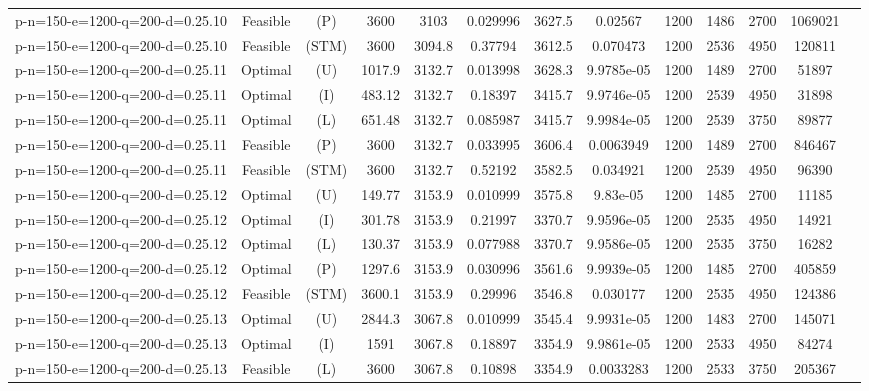\documentclass[landscape, a4paper]{article}
\newcommand{\STM}{\ensuremath{\mathrm{STM}}}
\newcommand{\Improved}{\ensuremath{\mathrm{I}}}
\newcommand{\Loose}{\ensuremath{\mathrm{L}}}
\newcommand{\Profit}{\ensuremath{\mathrm{P}}}
\newcommand{\Utility}{\ensuremath{\mathrm{U}}}
\begin{document}
\begin{center}
\begin{tabular}{lcccccccccccc}
p-n=150-e=1200-q=200-d=0.25.10 & Feasible & (\Profit) & 3600 & 3103 & 0.029996 & 3627.5 & 0.02567 & 1200 & 1486 & 2700 & 1069021 & \\
p-n=150-e=1200-q=200-d=0.25.10 & Feasible & (\STM) & 3600 & 3094.8 & 0.37794 & 3612.5 & 0.070473 & 1200 & 2536 & 4950 & 120811 & \\
p-n=150-e=1200-q=200-d=0.25.11 & Optimal & (\Utility) & 1017.9 & 3132.7 & 0.013998 & 3628.3 & 9.9785e-05 & 1200 & 1489 & 2700 & 51897 & \\
p-n=150-e=1200-q=200-d=0.25.11 & Optimal & (\Improved) & 483.12 & 3132.7 & 0.18397 & 3415.7 & 9.9746e-05 & 1200 & 2539 & 4950 & 31898 & \\
p-n=150-e=1200-q=200-d=0.25.11 & Optimal & (\Loose) & 651.48 & 3132.7 & 0.085987 & 3415.7 & 9.9984e-05 & 1200 & 2539 & 3750 & 89877 & \\
p-n=150-e=1200-q=200-d=0.25.11 & Feasible & (\Profit) & 3600 & 3132.7 & 0.033995 & 3606.4 & 0.0063949 & 1200 & 1489 & 2700 & 846467 & \\
p-n=150-e=1200-q=200-d=0.25.11 & Feasible & (\STM) & 3600 & 3132.7 & 0.52192 & 3582.5 & 0.034921 & 1200 & 2539 & 4950 & 96390 & \\
p-n=150-e=1200-q=200-d=0.25.12 & Optimal & (\Utility) & 149.77 & 3153.9 & 0.010999 & 3575.8 & 9.83e-05 & 1200 & 1485 & 2700 & 11185 & \\
p-n=150-e=1200-q=200-d=0.25.12 & Optimal & (\Improved) & 301.78 & 3153.9 & 0.21997 & 3370.7 & 9.9596e-05 & 1200 & 2535 & 4950 & 14921 & \\
p-n=150-e=1200-q=200-d=0.25.12 & Optimal & (\Loose) & 130.37 & 3153.9 & 0.077988 & 3370.7 & 9.9586e-05 & 1200 & 2535 & 3750 & 16282 & \\
p-n=150-e=1200-q=200-d=0.25.12 & Optimal & (\Profit) & 1297.6 & 3153.9 & 0.030996 & 3561.6 & 9.9939e-05 & 1200 & 1485 & 2700 & 405859 & \\
p-n=150-e=1200-q=200-d=0.25.12 & Feasible & (\STM) & 3600.1 & 3153.9 & 0.29996 & 3546.8 & 0.030177 & 1200 & 2535 & 4950 & 124386 & \\
p-n=150-e=1200-q=200-d=0.25.13 & Optimal & (\Utility) & 2844.3 & 3067.8 & 0.010999 & 3545.4 & 9.9931e-05 & 1200 & 1483 & 2700 & 145071 & \\
p-n=150-e=1200-q=200-d=0.25.13 & Optimal & (\Improved) & 1591 & 3067.8 & 0.18897 & 3354.9 & 9.9861e-05 & 1200 & 2533 & 4950 & 84274 & \\
p-n=150-e=1200-q=200-d=0.25.13 & Feasible & (\Loose) & 3600 & 3067.8 & 0.10898 & 3354.9 & 0.0033283 & 1200 & 2533 & 3750 & 205367 & \\

\end{tabular}
\end{center}
\end{document}
